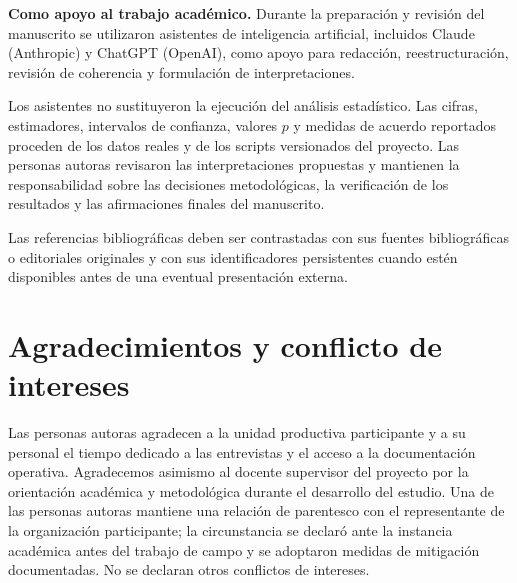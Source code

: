 \documentclass[runningheads]{llncs}
\begin{document}
\textbf{Como apoyo al trabajo acad\'emico.} Durante la preparaci\'on y revisi\'on
del manuscrito se utilizaron asistentes de inteligencia artificial, incluidos
Claude (Anthropic) y ChatGPT (OpenAI), como apoyo para redacci\'on,
reestructuraci\'on, revisi\'on de coherencia y formulaci\'on de interpretaciones.

Los asistentes no sustituyeron la ejecuci\'on del an\'alisis estad\'istico. Las
cifras, estimadores, intervalos de confianza, valores $p$ y medidas de acuerdo
reportados proceden de los datos reales y de los scripts versionados del proyecto.
Las personas autoras revisaron las interpretaciones propuestas y mantienen la
responsabilidad sobre las decisiones metodol\'ogicas, la verificaci\'on de los
resultados y las afirmaciones finales del manuscrito.

Las referencias bibliogr\'aficas deben ser contrastadas con sus fuentes
bibliogr\'aficas o editoriales originales y con sus identificadores persistentes
cuando est\'en disponibles antes de una eventual presentaci\'on externa.

\section*{Agradecimientos y conflicto de intereses}

Las personas autoras agradecen a la unidad productiva participante y a su personal
el tiempo dedicado a las entrevistas y el acceso a la documentaci\'on operativa. Agradecemos
asimismo al docente supervisor del proyecto por la orientaci\'on acad\'emica y metodol\'ogica durante
el desarrollo del estudio. Una de las personas autoras mantiene una relaci\'on de parentesco con el representante de la organizaci\'on participante; la circunstancia se declar\'o ante la instancia
acad\'emica antes del trabajo de campo y se adoptaron medidas de mitigaci\'on
documentadas. No se declaran otros conflictos de intereses.

\enlargethispage{3\baselineskip}


\end{document}
